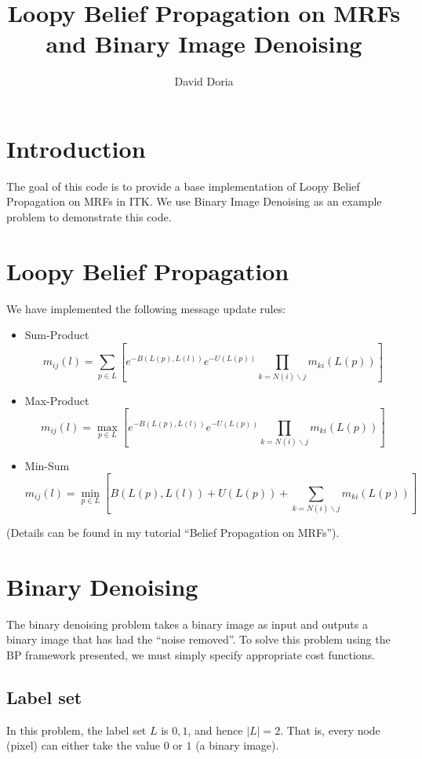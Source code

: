 \documentclass[a4paper,10pt]{article}
\title{Loopy Belief Propagation on MRFs and Binary Image Denoising}
\author{David Doria}
\begin{document}
\maketitle


\section{Introduction}
The goal of this code is to provide a base implementation of Loopy Belief Propagation on MRFs in ITK. We use Binary Image Denoising as an example problem to demonstrate this code.


\section{Loopy Belief Propagation}
We have implemented the following message update rules:

\begin{itemize}
\item Sum-Product
\begin{equation}
m_{ij}(l) = \sum_{p \in L} \left[ e^{-B(L(p), L(l))} e^{-U(L(p))} \prod_{k=N(i)\backslash j}  m_{ki}(L(p)) \right]
\end{equation}

\item Max-Product
\begin{equation}
m_{ij}(l) = \max_{p \in L} \left[ e^{-B(L(p), L(l))} e^{-U(L(p))} \prod_{k=N(i)\backslash j}  m_{ki}(L(p))  \right]
\end{equation}

\item Min-Sum
\begin{equation}
m_{ij}(l) = \min_{p \in L} \left[ B(L(p), L(l)) + U(L(p)) + \sum_{k=N(i)\backslash j}  m_{ki}(L(p))  \right]
\end{equation}

\end{itemize}

(Details can be found in my tutorial ``Belief Propagation on MRFs'').

\section{Binary Denoising}
The binary denoising problem takes a binary image as input and outputs a binary image that has had the ``noise removed''. To solve this problem using the BP framework presented, we must simply specify appropriate cost functions.

\subsection{Label set}
In this problem, the label set $L$ is ${0,1}$, and hence $|L| = 2$. That is, every node (pixel) can either take the value $0$ or $1$ (a binary image).
\end{document}
